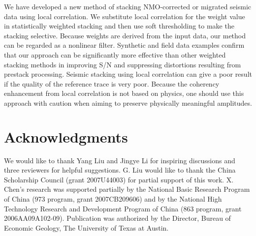 We have developed a new method of stacking NMO-corrected or migrated seismic 
data using local correlation. We substitute local correlation for the weight 
value in statistically weighted stacking and then use soft thresholding
to make the stacking selective. Because weights are derived from the input 
data, our method can be regarded as a nonlinear filter. Synthetic and
field data examples confirm that our approach can be significantly more 
effective than other weighted stacking methods in improving S/N and suppressing
distortions resulting from prestack processing. Seismic stacking using local 
correlation can give a poor result if the quality of the reference trace is 
very poor. Because the coherency enhancement from local correlation is not 
based on physics, one should use this approach with caution when aiming to 
preserve physically meaningful amplitudes.


\section{Acknowledgments}

We would like to thank Yang Liu and Jingye Li for inspiring discussions and 
three reviewers for helpful suggestions. G. Liu would like to thank the China 
Scholarship Council (grant 2007U44003) for partial support of this work. X.
Chen's research was supported partially by the National Basic Research Program 
of China (973 program, grant 2007CB209606) and by the National High Technology 
Research and Development Program of China (863 program, grant 2006AA09A102-09).
Publication was authorized by the Director, Bureau of Economic Geology, The 
University of Texas at Austin.




